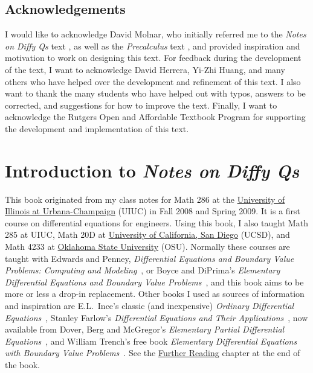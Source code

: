 \subsection*{Acknowledgements}

I would like to acknowledge David Molnar, who initially referred me to the \emph{Notes on Diffy Qs} text \cite{JL}, as well as the \emph{Precalculus} text \cite{SZ}, and provided inspiration and motivation to work on designing this text. For feedback during the development of the text, I want to acknowledge David Herrera, Yi-Zhi Huang, and many others who have helped over the development and refinement of this text. I also want to thank the many students who have helped out with typos, answers to be corrected, and suggestions for how to improve the text. Finally, I want to acknowledge the Rutgers Open and Affordable Textbook Program for supporting the development and implementation of this text.  

\vfill

\pagebreak

\section*{Introduction to \emph{Notes on Diffy Qs}}

This book \cite{JL} originated from my class notes for Math 286
at the \href{https://www.math.uiuc.edu/}{University of Illinois at
Urbana-Champaign} (UIUC)
in Fall 2008 and
Spring 2009.
It is a first course on differential equations for engineers.
Using this book, I also taught Math 285 at UIUC\@,
Math 20D at
\href{https://www.math.ucsd.edu/}{University of California, San Diego} (UCSD),
and Math 4233 at 
\href{https://math.okstate.edu/}{Oklahoma State University} (OSU).
Normally these courses are taught with
Edwards and Penney, \emph{Differential
Equations and Boundary Value Problems: Computing and Modeling}~\cite{EP}, or
Boyce and DiPrima's
\emph{Elementary
Differential Equations and Boundary Value Problems}~\cite{BD},
and this book aims to be more or less a drop-in replacement.
Other books I used as sources of information and inspiration
are E.L.\ Ince's classic (and inexpensive)
\emph{Ordinary Differential Equations}~\cite{I},
Stanley Farlow's \emph{Differential Equations and Their
Applications}~\cite{F}, now available from Dover,
Berg and McGregor's
\emph{Elementary Partial Differential Equations}~\cite{BM},
and William Trench's free book
\emph{Elementary
Differential Equations with Boundary Value Problems}~\cite{T}.
See the \hyperref[furtherreading:chapter]{Further Reading} chapter at the end of the book.


